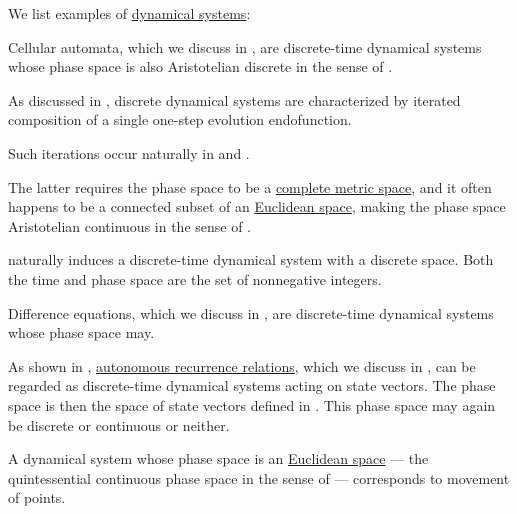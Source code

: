 \begin{example}\label{ex:def:dynamical_system}
  We list examples of \hyperref[def:dynamical_system]{dynamical systems}:
  \begin{thmenum}
     Cellular automata, which we discuss in , are discrete-time dynamical systems whose phase space is also Aristotelian discrete in the sense of .

     As discussed in , discrete dynamical systems are characterized by iterated composition of a single one-step evolution endofunction.

    Such iterations occur naturally in  and .

    The latter requires the phase space to be a \hyperref[def:complete_metric_space]{complete metric space}, and it often happens to be a connected subset of an \hyperref[def:euclidean_plane]{Euclidean space}, making the phase space Aristotelian continuous in the sense of .

      naturally induces a discrete-time dynamical system with a discrete space. Both the time and phase space are the set of nonnegative integers.

     Difference equations, which we discuss in , are discrete-time dynamical systems whose phase space may.

     As shown in , \hyperref[def:recurrence_relation/autonomous]{autonomous recurrence relations}, which we discuss in , can be regarded as discrete-time dynamical systems acting on state vectors. The phase space is then the space of state vectors defined in . This phase space may again be discrete or continuous or neither.

     A dynamical system whose phase space is an \hyperref[def:euclidean_plane]{Euclidean space} --- the quintessential continuous phase space in the sense of  --- corresponds to movement of points.


\end{thmenum}
\end{example}

